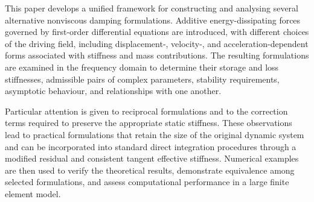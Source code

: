 This paper develops a unified framework for constructing and analysing several alternative nonviscous damping formulations. 
Additive energy-dissipating forces governed by first-order differential equations are introduced, with different choices of the driving field, including displacement-, velocity-, and acceleration-dependent forms associated with stiffness and mass contributions. 
The resulting formulations are examined in the frequency domain to determine their storage and loss stiffnesses, admissible pairs of complex parameters, stability requirements, asymptotic behaviour, and relationships with one another.

Particular attention is given to reciprocal formulations and to the correction terms required to preserve the appropriate static stiffness. 
These observations lead to practical formulations that retain the size of the original dynamic system and can be incorporated into standard direct integration procedures through a modified residual and consistent tangent effective stiffness. 
Numerical examples are then used to verify the theoretical results, demonstrate equivalence among selected formulations, and assess computational performance in a large finite element model.
